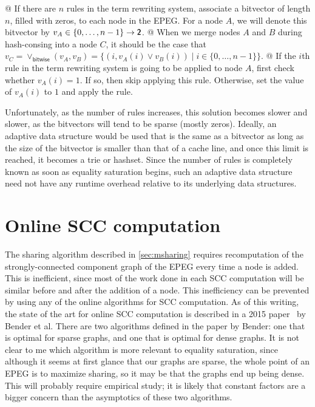 \documentclass[11pt]{report}
\newcommand{\textbs}[1]{{\sffamily\fontseries{sbc}\selectfont #1}}
\newcommand{\mathbs}[1]{\ensuremath{\text{\textbs{#1}}}}
\newcommand{\mbs}[1]{\ensuremath{\mathbs{#1}}}     %
\newcommand{\msf}[1]{\ensuremath{\mathsf{#1}}}     %
\begin{document}
\begin{easylist}[itemize]
@ {%
  If there are $n$ rules in the term rewriting system, associate a bitvector of
  length $n$, filled with zeros, to each node in the EPEG. For a node $A$, we
  will denote this bitvector by $v_A \in \{0, \ldots, n - 1\} \to \mbs{2}$.
}
@ {%
  When we merge nodes $A$ and $B$ during hash-consing into a node $C$, it should
  be the case that
  $ v_C
  = {\lor}_\msf{bitwise}(v_A, v_B)
  = \{(i, v_A(i) \lor v_B(i)) \mid i \in \{0, \ldots, n - 1\}\}$.
}
@ {%
  If the $i$th rule in the term rewriting system is going to be applied to
  node $A$, first check whether $v_A(i) = 1$. If so, then skip applying this
  rule. Otherwise, set the value of $v_A(i)$ to $1$ and apply the rule.
}
\end{easylist}

Unfortunately, as the number of rules increases, this solution becomes slower
and slower, as the bitvectors will tend to be sparse (mostly zeros). Ideally,
an adaptive data structure would be used that is the same as a bitvector as
long as the size of the bitvector is smaller than that of a cache line, and once
this limit is reached, it becomes a trie or hashset. Since the number of rules
is completely known as soon as equality saturation begins, such an adaptive data
structure need not have any runtime overhead relative to its underlying data
structures.

\section{Online SCC computation}
\label{sec:online-scc}

The sharing algorithm described in \autoref{sec:msharing} requires recomputation
of the strongly-connected component graph of the EPEG every time a node is
added. This is inefficient, since most of the work done in each SCC computation
will be similar before and after the addition of a node. This inefficiency can
be prevented by using any of the online algorithms for SCC computation. As of
this writing, the state of the art for online SCC computation is described in
a 2015 paper~\cite{bender-2015} by Bender et al. There are two algorithms
defined in the paper by Bender: one that is optimal for sparse graphs, and one
that is optimal for dense graphs. It is not clear to me which algorithm is more
relevant to equality saturation, since although it seems at first glance that
our graphs are sparse, the whole point of an EPEG is to maximize sharing, so
it may be that the graphs end up being dense. This will probably require
empirical study; it is likely that constant factors are a bigger concern than
the asymptotics of these two algorithms.
\end{document}
